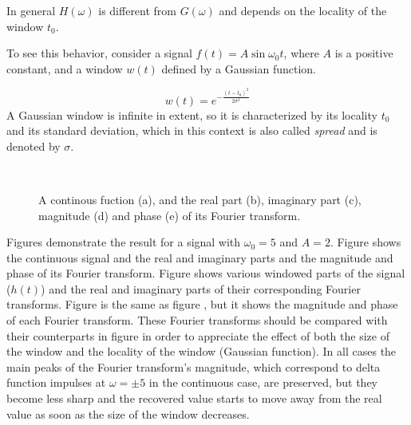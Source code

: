 In general $H(\omega)$ is different from $G(\omega)$ and depends on the locality of the window $t_0$.

To see this behavior, consider a signal $f(t)=A \sin \omega_{0} t$, where $A$ is a positive constant, and a window $w(t)$ defined by a Gaussian function. 

\begin{equation}\label{eq:1d_gaussian_function}
    w(t)=e^{-\frac{(t-t_0)^2}{2\sigma^2}}
\end{equation}
A Gaussian window is infinite in extent, so it is characterized by its locality $t_0$ and its standard deviation, which in this context is also called \textit{spread} and is denoted by $\sigma$. 

\begin{figure}
\centering
{}%
\\%
\hspace{0.33\textwidth}
\caption{A continous fuction (a), and the real part (b), imaginary part (c), magnitude (d) and phase (e) of its Fourier transform.}\label{fig:sin_signal_fourier_comp}
\end{figure}

Figures demonstrate the result for a signal with $\omega_0=5$ and $A=2$. Figure  shows the continuous signal and  the real and imaginary parts and the magnitude and phase of its Fourier transform.  Figure  shows various windowed parts of the signal ($h(t)$) and the real and imaginary parts of their corresponding Fourier transforms.  Figure is the same as figure , but it shows the magnitude and phase of each Fourier transform. These Fourier transforms should be compared with their counterparts in figure  in order to appreciate the effect of both the size of the window and the locality of the window (Gaussian function). In all cases the main peaks of the Fourier transform's magnitude, which correspond to delta function impulses at $\omega=\pm 5$ in the continuous case, are preserved, but they become less sharp and the recovered value starts to move away from the real value as soon as the size of the window decreases. 

